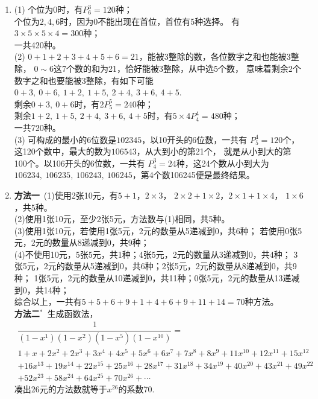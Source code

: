 \begin{enumerate}[label={\textbf{\thechapter.\arabic*}},leftmargin=
    \inteval{\myenumleftmargin}pt]
\item (1) 个位为0时，有$P_6^3=120$种；\\
个位为$2,4,6$时，因为0不能出现在首位，首位有5种选择。
有$ 3\times 5 \times 5 \times 4= 300 $种；\\
一共420种。\\
(2) $0+1+2+3+4+5+6=21$，能被3整除的数，各位数字之和也能被3整除，
$ 0\sim 6 $这7个数的和为21，恰好能被3整除，从中选5个数，
意味着剩余2个数字之和也要能被3整除，有如下可能
$ 0+3,\ 0+6,\ 1+2,\ 1+5,\ 2+4,\ 3+6,\ 4+5 $.\\
剩余$0+3,\ 0+6$时，有$2P_5^5=240$种；\\
剩余$1+2,\ 1+5,\ 2+4,\ 3+6,\ 4+5 $时，有$5\times4 P_4^4=480$种；\\
一共720种。\\
(3) 可构成的最小的6位数是$ 102345 $，以10开头的6位数，一共有
$P_5^4=120$个，这120个数中，最大的数为$106543$，从大到小的第21个，
就是从小到大的第100个。以106开头的6位数，一共有
$P_4^3=24 $种，这24个数从小到大为$106234,\ 106235,
\ 106243,\ 106245 $，第4个数106245便是最终结果。

\item \textbf{方法一}\ 
(1)使用2张10元，有$ 5+1 $，$ 2\times 3 $，
$ 2\times 2+1\times 2 $，$ 2\times 1+1\times 4 $，
$ 1\times 6 $，共5种。\\
(2)使用1张10元，至少2张5元，方法数与(1)相同，共5种。\\
(3)使用1张10元，若使用1张5元，2元的数量从5递减到0，共6种；
若使用0张5元，2元的数量从8递减到0，共9种；\\
(4)不使用10元，5张5元，共1种；4张5元，2元的数量从3递减到0，共4种；
3张5元，2元的数量从5递减到0，共6种；2张5元，2元的数量从8递减到0，共9种；
1张5元，2元的数量从10递减到0，共11种；0张5元，2元的数量从13递减到0，共14种；\\
综合以上，一共有$ 5+5+6+9+1+4+6+9+11+14=70 $种方法。\\
\textbf{方法二}$ ^* $\ 生成函数法，
\begin{gather*}
    \dfrac{1}{(1-x^1)(1-x^2)(1-x^{5})(1-x^{10})}=\\
    1+x+2x^{2}+2x^{3}+3x^{4}+4x^{5}+5x^{6}+6x^{7}+7x^{8}+8x^{9}+11x^{10}+12x^{11}+15x^{12}\\ +16x^{13}+19x^{14}+22x^{15}+25x^{16}+28x^{17}+31x^{18}+34x^{19}+40x^{20}+43x^{21}+49x^{22}\\
    +52x^{23}+58x^{24}+64x^{25}+70x^{26}+\cdots
\end{gather*}
凑出26元的方法数就等于$ x^{26} $的系数70. 


\end{enumerate}
